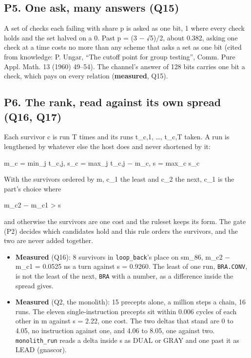 \subsection{\texorpdfstring{P5. One ask, many answers (Q15)}{P5. One ask, many answers (Q15)}}

A set of checks each failing with share p is asked as one bit, 1 where every check holds and the set halved on a 0. Past p = (3 − √5)/2, about 0.382, asking one check at a time costs no more than any scheme that asks a set as one bit (cited from knowledge: P. Ungar, “The cutoff point for group testing”, Comm. Pure Appl. Math. 13 (1960) 49–54). The channel's answer of 128 bits carries one bit a check, which pays on every relation (\textbf{measured}, Q15).

\subsection{\texorpdfstring{P6. The rank, read against its own spread (Q16, Q17)}{P6. The rank, read against its own spread (Q16, Q17)}}

Each survivor c is run T times and its runs t\_\allowbreak{}c,1, …, t\_\allowbreak{}c,T taken. A run is lengthened by whatever else the host does and never shortened by it:

m\_\allowbreak{}c = min\_\allowbreak{}j t\_\allowbreak{}c,j,  s\_\allowbreak{}c = max\_\allowbreak{}j t\_\allowbreak{}c,j − m\_\allowbreak{}c,  s = max\_\allowbreak{}c s\_\allowbreak{}c

With the survivors ordered by m, c\_\allowbreak{}1 the least and c\_\allowbreak{}2 the next, c\_\allowbreak{}1 is the part's choice where

m\_\allowbreak{}c2 − m\_\allowbreak{}c1 > s

and otherwise the survivors are one cost and the ruleset keeps its form. The gate (P2) decides which candidates hold and this rule orders the survivors, and the two are never added together.

\begin{itemize}
\item \textbf{Measured} (Q16): 8 survivors in \texttt{loop\_\allowbreak{}back}'s place on sm\_\allowbreak{}86, m\_\allowbreak{}c2 − m\_\allowbreak{}c1 = 0.0525 ns a turn against s = 0.9260. The least of one run, \texttt{BRA.\allowbreak{}CONV}, is not the least of the next, \texttt{BRA} with a number, as a difference inside the spread gives.
\item \textbf{Measured} (Q2, the monolith): 15 precepts alone, a million steps a chain, 16 runs. The eleven single-instruction precepts sit within 0.006 cycles of each other in m against s = 2.22, one cost. The two deltas that stand are 0 to 4.05, no instruction against one, and 4.06 to 8.05, one against two. \texttt{monolith\_\allowbreak{}run} reads a delta inside s as DUAL or GRAY and one past it as LEAD (gnascor).
\end{itemize}

